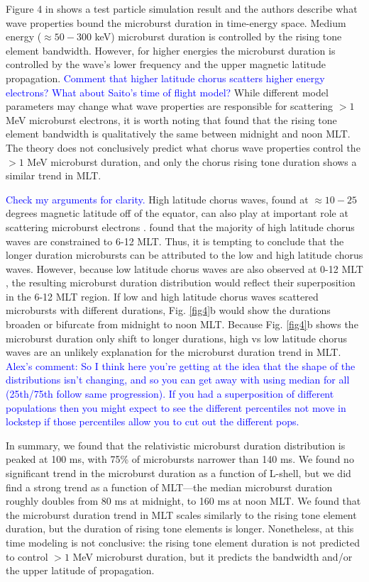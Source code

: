\documentclass[draft]{agujournal2019}
\begin{document}
Figure 4 in  shows a test particle simulation result and the authors describe what wave properties bound the microburst duration in time-energy space. Medium energy ($\approx 50-300$ keV) microburst duration is controlled by the rising tone element bandwidth. However, for higher energies the microburst duration is controlled by the wave's lower frequency and the upper magnetic latitude propagation. \textcolor{blue}{Comment that higher latitude chorus scatters higher energy electrons? What about Saito's time of flight model?} While different model parameters may change what wave properties are responsible for scattering $>1$ MeV microburst electrons, it is worth noting that  found that the rising tone element bandwidth is qualitatively the same between midnight and noon MLT. The theory does not conclusively predict what chorus wave properties control the $> 1$ MeV microburst duration, and only the chorus rising tone duration shows a similar trend in MLT.

\textcolor{blue}{Check my arguments for clarity.} High latitude chorus waves, found at $\approx 10-25$ degrees magnetic latitude off of the equator, can also play at important role at scattering microburst electrons \cite{Lorentzen2001a}.  found that the majority of high latitude chorus waves are constrained to 6-12 MLT. Thus, it is tempting to conclude that the longer duration microbursts can be attributed to the low and high latitude chorus waves. However, because low latitude chorus waves are also observed at 0-12 MLT \cite{Li2009a}, the resulting microburst duration distribution would reflect their superposition in the 6-12 MLT region. If low and high latitude chorus waves scattered microbursts with different durations, Fig. \ref{fig4}b would show the durations broaden or bifurcate from midnight to noon MLT. Because Fig. \ref{fig4}b shows the microburst duration only shift to longer durations, high vs low latitude chorus waves are an unlikely explanation for the microburst duration trend in MLT. \textcolor{blue}{Alex's comment:  So I think here you’re getting at the idea that the shape of the distributions isn’t changing, and so you can get away with using median for all (25th/75th follow same progression). If you had a superposition of different populations then you might expect to see the different percentiles not move in lockstep if those percentiles allow you to cut out the different pops.}

In summary, we found that the relativistic microburst duration distribution is peaked at 100 ms, with 75\% of microbursts narrower than 140 ms. We found no significant trend in the microburst duration as a function of L-shell, but we did find a strong trend as a function of MLT---the median microburst duration roughly doubles from 80 ms at midnight, to 160 ms at noon MLT. We found that the microburst duration trend in MLT scales similarly to the rising tone element duration, but the duration of rising tone elements is longer. Nonetheless, at this time modeling is not conclusive: the rising tone element duration is not predicted to control $>1$ MeV microburst duration, but it predicts the bandwidth and/or the upper latitude of propagation.
\end{document}
